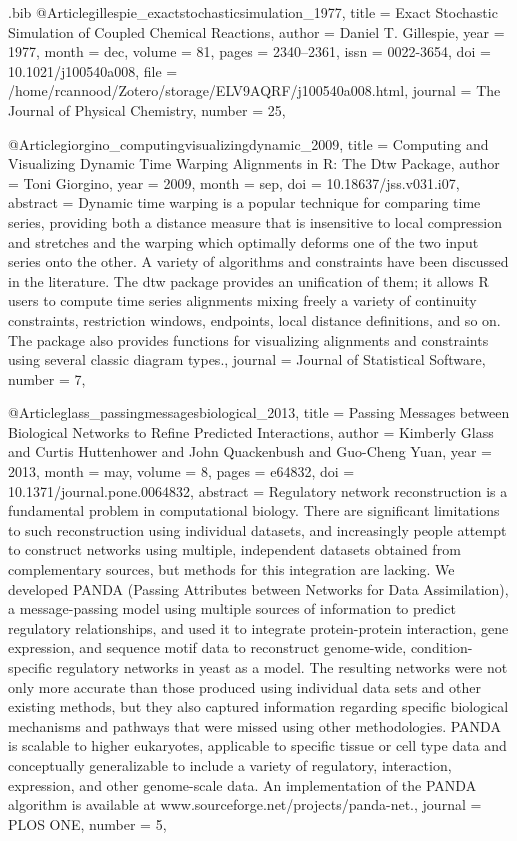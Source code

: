 \documentclass[
  table,
  10pt,
  a4paper]{article}
\begin{document}
\begin{filecontents}{\jobname.bib}
@Article{gillespie_exactstochasticsimulation_1977,
	title = {Exact Stochastic Simulation of Coupled Chemical Reactions},
	author = {Daniel T. Gillespie},
	year = {1977},
	month = {dec},
	volume = {81},
	pages = {2340--2361},
	issn = {0022-3654},
	doi = {10.1021/j100540a008},
	file = {/home/rcannood/Zotero/storage/ELV9AQRF/j100540a008.html},
	journal = {The Journal of Physical Chemistry},
	number = {25},
}

@Article{giorgino_computingvisualizingdynamic_2009,
	title = {Computing and {{Visualizing Dynamic Time Warping Alignments}} in {{R}}: {{The}} Dtw {{Package}}},
	author = {Toni Giorgino},
	year = {2009},
	month = {sep},
	doi = {10.18637/jss.v031.i07},
	abstract = {Dynamic time warping is a popular technique for comparing time series, providing both a distance measure that is insensitive to local compression and stretches and the warping which optimally deforms one of the two input series onto the other. A variety of algorithms and constraints have been discussed in the literature. The dtw package provides an unification of them; it allows R users to compute time series alignments mixing freely a variety of continuity constraints, restriction windows, endpoints, local distance definitions, and so on. The package also provides functions for visualizing alignments and constraints using several classic diagram types.},
	journal = {Journal of Statistical Software},
	number = {7},
}

@Article{glass_passingmessagesbiological_2013,
	title = {Passing {{Messages}} between {{Biological Networks}} to {{Refine Predicted Interactions}}},
	author = {Kimberly Glass and Curtis Huttenhower and John Quackenbush and Guo-Cheng Yuan},
	year = {2013},
	month = {may},
	volume = {8},
	pages = {e64832},
	doi = {10.1371/journal.pone.0064832},
	abstract = {Regulatory network reconstruction is a fundamental problem in computational biology. There are significant limitations to such reconstruction using individual datasets, and increasingly people attempt to construct networks using multiple, independent datasets obtained from complementary sources, but methods for this integration are lacking. We developed PANDA (Passing Attributes between Networks for Data Assimilation), a message-passing model using multiple sources of information to predict regulatory relationships, and used it to integrate protein-protein interaction, gene expression, and sequence motif data to reconstruct genome-wide, condition-specific regulatory networks in yeast as a model. The resulting networks were not only more accurate than those produced using individual data sets and other existing methods, but they also captured information regarding specific biological mechanisms and pathways that were missed using other methodologies. PANDA is scalable to higher eukaryotes, applicable to specific tissue or cell type data and conceptually generalizable to include a variety of regulatory, interaction, expression, and other genome-scale data. An implementation of the PANDA algorithm is available at www.sourceforge.net/projects/panda-net.},
	journal = {PLOS ONE},
	number = {5},
}


\end{filecontents}
\end{document}
